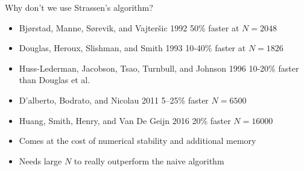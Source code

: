 \documentclass[UKenglish]{beamer}
\begin{document}

\begin{frame}[c]{Why don't we use Strassen's algorithm?}
    \begin{itemize}
        \pause
        \item Bjørstad, Manne, Sørevik, and Vajteršic 1992 \break \alert{50\%
                  faster at $N = 2048$}
              \pause
        \item Douglas, Heroux, Slishman, and Smith 1993 \break \alert{10-40\%
                  faster at $N = 1826$}
              \pause
        \item Huss-Lederman, Jacobson, Tsao, Turnbull, and Johnson 1996 \break
              \alert{10-20\% faster than Douglas et al.}
              \pause
        \item D'alberto, Bodrato, and Nicolau 2011 \break \alert{5–25\% faster
                  $N = 6500$}
              \pause
        \item Huang, Smith, Henry, and Van De Geijn 2016 \break \alert{20\%
                  faster $N = 16000$}
              \pause
        \item Comes at the cost of numerical stability and additional memory
        \item Needs large $N$ to really outperform the naive algorithm
    \end{itemize}
\end{frame}
\end{document}
